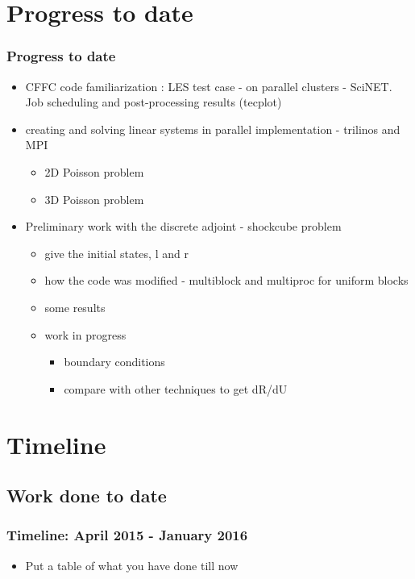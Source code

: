 \documentclass{beamer}
\begin{document}
\section[Progress]{Progress to date}

\begin{frame}%
\frametitle{Progress to date}
\scriptsize
\begin{itemize}
\item CFFC code familiarization : LES test case - on parallel clusters - SciNET. Job scheduling and post-processing results (tecplot)
\item creating and solving linear systems in parallel implementation - trilinos and MPI
\begin{itemize}
\item 2D Poisson problem
\item  3D Poisson problem
\end{itemize}
\item Preliminary work with the discrete adjoint - shockcube problem
\begin{itemize}
\item give the initial states, l and r
\item how the code was modified - multiblock and multiproc for uniform blocks
\item some results
\item work in progress
\begin{itemize}
\item boundary conditions
\item compare with other techniques to get dR/dU
\end{itemize}
\end{itemize}
\end{itemize}
\end{frame}


\section[Timeline]{Timeline}

\subsection[Present]{Work done to date}
\begin{frame}%
\frametitle{Timeline: April 2015  - January 2016}
\scriptsize
\begin{itemize}
\item Put a table of what you have done till now
\end{itemize}
\end{frame}
\end{document}
